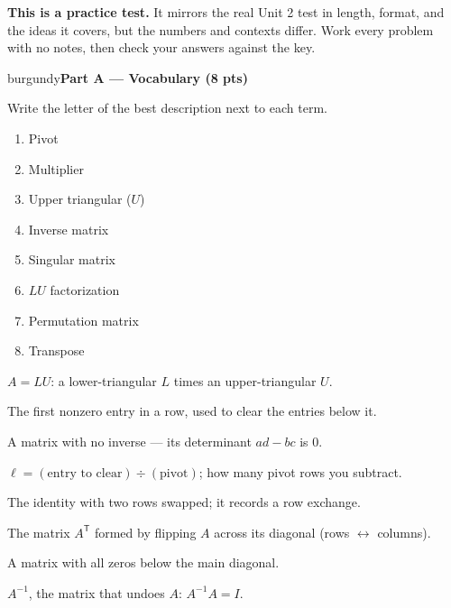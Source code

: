 \documentclass[10pt]{article}
\newcommand{\parthead}[1]{%
  \vspace{6pt}\noindent
  \begin{headlinebox}{burgundy}{\color{white}\bfseries #1}\end{headlinebox}%
  \vspace{4pt}}
\begin{document}
\namedateperiod

\vspace{0.10in}
\begin{remindbox}
\small
\textbf{This is a practice test.} It mirrors the real Unit 2 test in length, format,
and the ideas it covers, but the numbers and contexts differ. Work every problem
with no notes, then check your answers against the key.
\end{remindbox}

\parthead{Part A --- Vocabulary (8 pts)}
Write the letter of the best description next to each term.

\vspace{4pt}
\noindent
\begin{minipage}[t]{0.44\textwidth}
\begin{enumerate}[leftmargin=2.2em, itemsep=7pt, label=\arabic*.]
  \item Pivot 
  \item Multiplier 
  \item Upper triangular ($U$) 
  \item Inverse matrix 
  \item Singular matrix 
  \item $LU$ factorization 
  \item Permutation matrix 
  \item Transpose 
\end{enumerate}
\end{minipage}%
\hfill
\begin{minipage}[t]{0.53\textwidth}
\small
\begin{description}[leftmargin=1.4em, itemsep=3pt]
  \item[(A)] $A=LU$: a lower-triangular $L$ times an upper-triangular $U$.
  \item[(B)] The first nonzero entry in a row, used to clear the entries below it.
  \item[(C)] A matrix with no inverse --- its determinant $ad-bc$ is $0$.
  \item[(D)] $\ell=(\text{entry to clear})\div(\text{pivot})$; how many pivot rows you subtract.
  \item[(E)] The identity with two rows swapped; it records a row exchange.
  \item[(F)] The matrix $A^{\mathsf T}$ formed by flipping $A$ across its diagonal (rows $\leftrightarrow$ columns).
  \item[(G)] A matrix with all zeros below the main diagonal.
  \item[(H)] $A^{-1}$, the matrix that undoes $A$: $A^{-1}A=I$.
\end{description}
\end{minipage}
\end{document}

